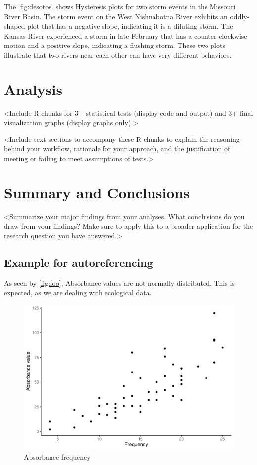 \documentclass[12pt,]{article}
\begin{document}
The \autoref{fig:desotos} shows Hysteresis plots for two storm events in
the Missouri River Basin. The storm event on the West Nishnabotna River
exhibits an oddly-shaped plot that has a negative slope, indicating it
is a diluting storm. The Kansas River experienced a storm in late
February that has a counter-clockwise motion and a positive slope,
indicating a flushing storm. These two plots illustrate that two rivers
near each other can have very different behaviors.

\newpage

\hypertarget{analysis}{%
\section{Analysis}\label{analysis}}

\textless{}Include R chunks for 3+ statistical tests (display code and
output) and 3+ final visualization graphs (display graphs
only).\textgreater{}

\textless{}Include text sections to accompany these R chunks to explain
the reasoning behind your workflow, rationale for your approach, and the
justification of meeting or failing to meet assumptions of
tests.\textgreater{}

\newpage

\hypertarget{summary-and-conclusions}{%
\section{Summary and Conclusions}\label{summary-and-conclusions}}

\textless{}Summarize your major findings from your analyses. What
conclusions do you draw from your findings? Make sure to apply this to a
broader application for the research question you have
answered.\textgreater{}

\hypertarget{example-for-autoreferencing}{%
\subsection{Example for
autoreferencing}\label{example-for-autoreferencing}}

As seen by \autoref{fig:foo}, Absorbance values are not normally
distributed. This is expected, as we are dealing with ecological data.

\begin{figure}
\centering
\includegraphics{Project_Template_files/figure-latex/foo-1.pdf}
\caption{\label{fig:foo}Absorbance frequency}
\end{figure}
\end{document}
